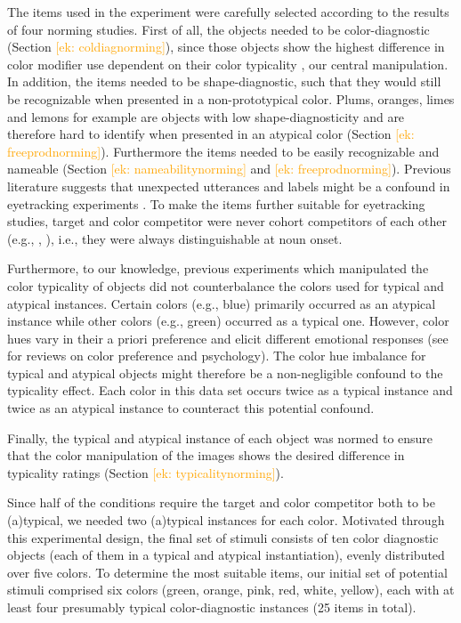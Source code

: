 \documentclass[a4paper,man,floatsintext,natbib]{apa6}
\newcommand{\ek}[1]{\textcolor{Orange}{[ek: #1]}}
\begin{document}
The items used in the experiment were carefully selected according to the results of four norming studies. 
First of all, the objects needed to be color-diagnostic (Section \ek{coldiagnorming}), since those objects show the highest difference in color modifier use dependent on their color typicality \citep{Westerbeek:2015,Tanaka:1999,Sedivy:2003}, our central manipulation. In addition, the items needed to be shape-diagnostic, such that they would still be recognizable when presented in a non-prototypical color. Plums, oranges, limes and lemons for example are objects with low shape-diagnosticity and are therefore hard to identify when presented in an atypical color (Section \ek{freeprodnorming}). Furthermore the items needed to be easily recognizable and nameable (Section \ek{nameabilitynorming} and \ek{freeprodnorming}). Previous literature suggests that unexpected utterances and labels might be a confound in eyetracking experiments \citep{Qing:2018}. To make the items further suitable for eyetracking studies, target and color competitor were never cohort competitors of each other (e.g., \cite{Cole:1980}, \cite{Marslen-Wilson:1984}), i.e., they were always distinguishable at noun onset.

Furthermore, to our knowledge, previous experiments which manipulated the color typicality of objects did not counterbalance the colors used for typical and atypical instances. Certain colors (e.g., blue) primarily occurred as an atypical instance while other colors (e.g., green) occurred as a typical one. However, color hues vary in their a priori preference and elicit different emotional responses (see \cite{Palmer:2013, Elliot:2014} for reviews on color preference and psychology). The color hue imbalance for typical and atypical objects might therefore be a non-negligible confound to the typicality effect. Each color in this data set occurs twice as a typical instance and twice as an atypical instance to counteract this potential confound.

Finally, the typical and atypical instance of each object was normed to ensure that the color manipulation of the images shows the desired difference in typicality ratings (Section \ek{typicalitynorming}).

Since half of the conditions require the target and color competitor both to be (a)typical, we needed two (a)typical instances for each color. Motivated through this experimental design, the final set of stimuli consists of ten color diagnostic objects (each of them in a typical and atypical instantiation), evenly distributed over five colors. To determine the most suitable items, our initial set of potential stimuli comprised six colors (green, orange, pink, red, white, yellow), each with at least four presumably typical color-diagnostic instances (25 items in total).
\end{document}
